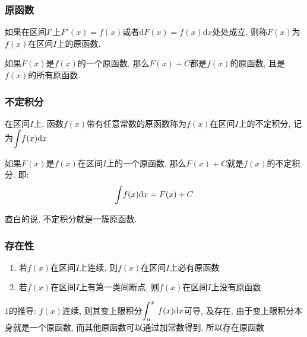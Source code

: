 \subsubsection{原函数}
如果在区间$ I' $上$ F'(x)=f(x) $或者$ \mathrm{d}F(x)=f(x)\mathrm{d}x $处处成立, 则称$ F(x) $为$ f(x) $在区间$ I $上的原函数.
\begin{tcolorbox}
    如果$ F(x) $是$ f(x) $的一个原函数, 那么$ F(x)+C $都是$ f(x) $的原函数, 且是$ f(x) $的所有原函数.
\end{tcolorbox}
\subsubsection{不定积分}
在区间$ I $上, 函数$ f(x) $带有任意常数的原函数称为$ f(x) $在区间$ I $上的不定积分, 记为$ \displaystyle \int_{}\hspace{.2em} f(x)\mathrm{d}x $ \par 如果$ F(x) $是$ f(x) $在区间$ I $上的一个原函数, 那么$ F(x)+C $就是$ f(x) $的不定积分. 即:
\begin{equation*}
    \displaystyle\int_{}\hspace{.2em} f(x)\mathrm{d}x =F(x)+C
\end{equation*}\par
直白的说, 不定积分就是一簇原函数.
\subsubsection{存在性}
\begin{enumerate}
    \item 若$ f(x) $在区间$ I $上连续, 则$ f(x) $在区间$ I $上必有原函数
    \item 若$ f(x) $在区间$ I $上有第一类间断点, 则$ f(x)
          $在区间$ I $上没有原函数
\end{enumerate}
\begin{tcolorbox}
    $ 1 $的推导: $ f(x) $连续, 则其变上限积分$ \displaystyle\int_{a}^{x}\hspace{.2em}f(x)\mathrm{d}x $可导, 及存在, 由于变上限积分本身就是一个原函数, 而其他原函数可以通过加常数得到, 所以存在原函数
\end{tcolorbox}
